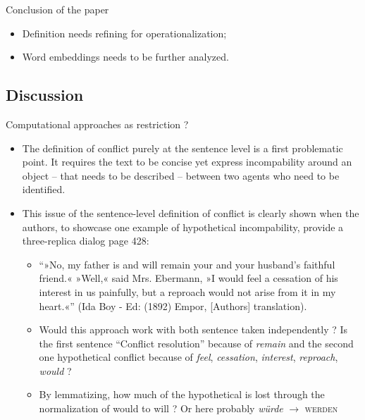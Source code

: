 \documentclass[aspectratio=169]{beamer}
\begin{document}
\begin{frame}{Conclusion of the paper}
    \begin{itemize}
        \item Definition needs refining for operationalization;
        \item Word embeddings needs to be further analyzed.
    \end{itemize}
\end{frame}

\subsection{Discussion}

\begin{frame}{Computational approaches as restriction ?}
    \begin{itemize}
        \item The definition of conflict purely at the sentence level is a first problematic point. It requires the text to be concise yet express incompability around an object -- that needs to be described --  between two agents who need to be identified.
        \item This issue of the sentence-level definition of conflict is clearly shown when the authors, to showcase one example of hypothetical incompability, provide a three-replica dialog page 428:
        \begin{itemize}
            \item  “»No, my father is and will remain your and your husband’s faithful friend.« »Well,« said Mrs. Ebermann, »I would feel a cessation of his interest in us painfully, but a reproach would not arise from it in my heart.«” (Ida Boy - Ed: (1892) Empor, [Authors] translation). 
            \item Would this approach work with both sentence taken independently ? Is the first sentence ``Conflict resolution'' because of \textit{remain} and the second one hypothetical conflict because of \textit{feel}, \textit{cessation}, \textit{interest}, \textit{reproach}, \textit{would} ?
            \item By lemmatizing, how much of the hypothetical is lost through the normalization of would to will ? Or here probably \textit{würde} $\rightarrow$ \textsc{werden}
        \end{itemize}
    \end{itemize}
\end{frame}
\end{document}
